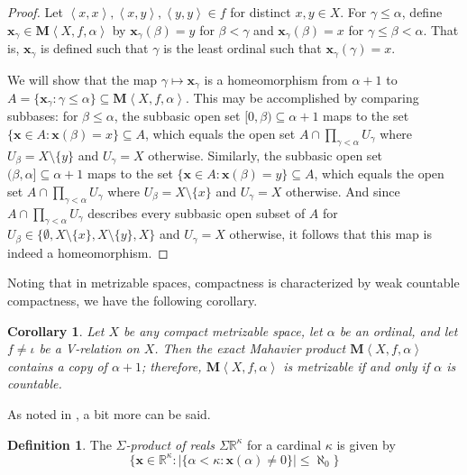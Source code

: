 \documentclass{article}
\newcommand{\term}{\textit}
\newcommand{\vect}{\mathbf}
\newcommand{\tuple}[1]{\left\langle{#1}\right\rangle}
\newcommand{\maProd}[1]{{\mathbf{M}}\tuple{#1}}
\theoremstyle{plain}
\newtheorem{corollary}[theorem]{Corollary}
\theoremstyle{definition}
\newtheorem{definition}[theorem]{Definition}
\theoremstyle{remark}
\begin{document}
\begin{proof}
  Let \(\tuple{x,x},\tuple{x,y},\tuple{y,y}\in f\)
  for distinct \(x,y\in X\). For \(\gamma\leq \alpha\),
  define \(\vect{x}_\gamma\in\maProd{X,f,\alpha}\) by
  \(\vect{x}_\gamma(\beta)=y\) for \(\beta<\gamma\)
  and \(\vect{x}_\gamma(\beta)=x\) for \(\gamma\leq\beta<\alpha\).
  That is, \(\vect{x}_\gamma\) is defined such that \(\gamma\) is
  the least ordinal such that \(\vect{x}_\gamma(\gamma)=x\).

  We will show that the map \(\gamma\mapsto\vect{x}_\gamma\) is
  a homeomorphism from \(\alpha+1\) to
  \(A=\{\vect{x}_\gamma:\gamma\leq\alpha\}\subseteq\maProd{X,f,\alpha}\). 
  This may be accomplished by comparing subbases: for \(\beta\leq\alpha\),
  the subbasic open set \([0,\beta)\subseteq\alpha+1\) maps to
  the set \(\{\vect{x}\in A:\vect{x}(\beta)=x\}\subseteq A\),
  which equals the open set \(A\cap\prod_{\gamma<\alpha}U_\gamma\) where
  \(U_\beta=X\setminus\{y\}\) and \(U_\gamma=X\) otherwise.
  Similarly, the subbasic open set \((\beta,\alpha]\subseteq\alpha+1\) 
  maps to the set \(\{\vect{x}\in A:\vect{x}(\beta)=y\}\subseteq A\), 
  which equals the open set \(A\cap\prod_{\gamma<\alpha}U_\gamma\) where
  \(U_{\beta}=X\setminus\{x\}\) and \(U_\gamma=X\) otherwise.
  And since \(A\cap\prod_{\gamma<\alpha}U_\gamma\) describes every
  subbasic open subset of \(A\) for 
  \(U_\beta\in\{\emptyset,X\setminus\{x\},X\setminus\{y\},X\}\)
  and \(U_\gamma=X\) otherwise,
  it follows that this map is indeed a homeomorphism.
\end{proof}

Noting that in metrizable spaces, compactness is characterized by
weak countable compactness, we have the following corollary.

\begin{corollary}
  Let \(X\) be any compact metrizable space, let
  \(\alpha\) be an ordinal, and let \(f\not=\iota\) be a 
  V-relation on $X$. Then the exact Mahavier product 
  \(\maProd{X,f,\alpha}\) contains a copy of \(\alpha+1\); 
  therefore, \(\maProd{X,f,\alpha}\) is metrizable
  if and only if \(\alpha\) is countable.
\end{corollary}

As noted in \cite{CLONTZVARAGONA}, a bit more can be said.

\begin{definition}
  The \term{\(\Sigma\)-product of reals \(\Sigma\mathbb{R}^\kappa\)}
  for a cardinal \(\kappa\) is given by
  \[\{
    \vect x\in \mathbb{R}^\kappa
  :
    |\{\alpha<\kappa:\vect{x}(\alpha)\not=0\}|\leq\aleph_0
  \}\]
\end{definition}
\end{document}
